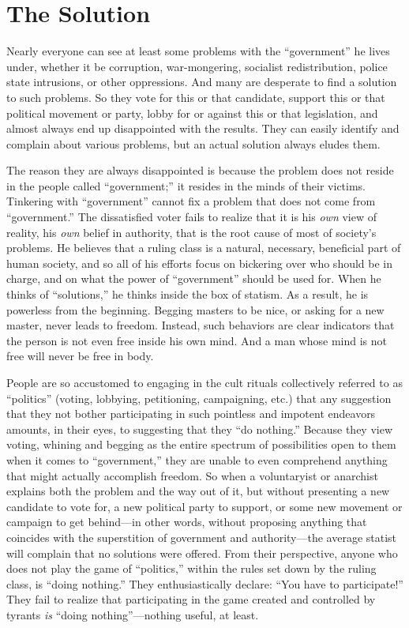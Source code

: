 \documentclass{book}
\begin{document}
\section{The Solution}

Nearly everyone can see at least some problems with the \enquote{government} he lives under, whether it be corruption, war-mongering, socialist redistribution, police state intrusions, or other oppressions. And many are desperate to find a solution to such problems. So they vote for this or that candidate, support this or that political movement or party, lobby for or against this or that legislation, and almost always end up disappointed with the results. They can easily identify and complain about various problems, but an actual solution always eludes them.

The reason they are always disappointed is because the problem does not reside in the people called \enquote{government;} it resides in the minds of their victims. Tinkering with \enquote{government} cannot fix a problem that does not come from \enquote{government.} The dissatisfied voter fails to realize that it is his \emph{own} view of reality, his \emph{own} belief in authority, that is the root cause of most of society's problems. He believes that a ruling class is a natural, necessary, beneficial part of human society, and so all of his efforts focus on bickering over who should be in charge, and on what the power of \enquote{government} should be used for. When he thinks of \enquote{solutions,} he thinks inside the box of statism. As a result, he is powerless from the beginning. Begging masters to be nice, or asking for a new master, never leads to freedom. Instead, such behaviors are clear indicators that the person is not even free inside his own mind. And a man whose mind is not free will never be free in body.

People are so accustomed to engaging in the cult rituals collectively referred to as \enquote{politics} (voting, lobbying, petitioning, campaigning, etc.) that any suggestion that they not bother participating in such pointless and impotent endeavors amounts, in their eyes, to suggesting that they \enquote{do nothing.} Because they view voting, whining and begging as the entire spectrum of possibilities open to them when it comes to \enquote{government,} they are unable to even comprehend anything that might actually accomplish freedom. So when a voluntaryist or anarchist explains both the problem and the way out of it, but without presenting a new candidate to vote for, a new political party to support, or some new movement or campaign to get behind---in other words, without proposing anything that coincides with the superstition of government and authority---the average statist will complain that no solutions were offered. From their perspective, anyone who does not play the game of \enquote{politics,} within the rules set down by the ruling class, is \enquote{doing nothing.} They enthusiastically declare: \enquote{You have to participate!} They fail to realize that participating in the game created and controlled by tyrants \emph{is} \enquote{doing nothing}---nothing useful, at least.
\end{document}
